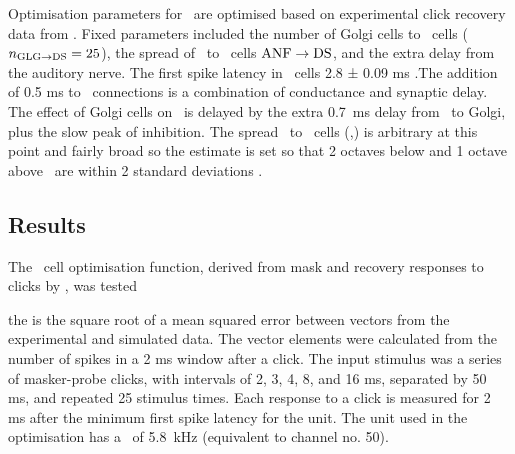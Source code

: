 % 

\smallskip{}

Optimisation parameters for \GLGDS~are optimised based on experimental click
recovery data from \citep{BackoffPalombiEtAl:1997}.  Fixed parameters included
the number of Golgi cells to \DS~cells ($\protect n_{\protect\textrm{{GLG}}\to\textrm{{DS}}} = 25$), the spread of \ANFs~to
\DS~cells $\protect\textrm{{ANF}}\to\textrm{{DS}}$, and the extra delay from the auditory nerve.  The first
spike latency in \DS~cells 2.8 ± 0.09 ms \citep{RhodeSmith:1986}.The addition of
0.5 ms to \ANFDS~connections is a combination of conductance and synaptic
delay. The effect of Golgi cells on \DS~is delayed by the extra 0.7~ms delay
from \ANF~to Golgi, plus the slow peak of \GABAa inhibition.  The spread \ANF~to
\DS~cells (\sANFDSh,\sANFDSl) is arbitrary at this point and fairly broad so the
estimate is set so that 2 octaves below and 1 octave above \CF~are within 2
standard deviations \citep{PaoliniClark:1999}.





\subsection{Results}\label{sec:DS:results}

The \DS~cell optimisation function, derived from mask and recovery responses to
clicks by \citet{BackoffPalombiEtAl:1997}, was tested


the is the square root of a mean squared error between vectors from the
experimental and simulated data. The vector elements were calculated from the
number of spikes in a 2 ms window after a click.  The input stimulus was a
series of masker-probe clicks, with intervals of 2, 3, 4, 8, and 16 ms,
separated by 50 ms, and repeated 25 stimulus times. Each response to a click is
measured for 2 ms after the minimum first spike latency for the unit.  The unit
used in the optimisation has a \CF~of 5.8~kHz (equivalent to channel no. 50).


\smallskip{}

